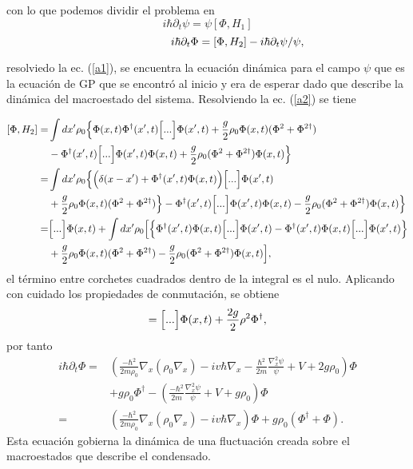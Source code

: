 con lo que podemos dividir el problema en
\begin{equation}\label{a1}
i\hbar\partial_t\psi=\psi[\Phi,H_1]
\end{equation}
\begin{equation}\label{a2}
\hspace{1.9cm} i\hbar\partial_t\Phi=[\Phi,H_2]-i\hbar\partial_t\psi/\psi,
\end{equation}

resolviedo la ec. (\ref{a1}), se encuentra la ecuaci\'{o}n din\'{a}mica para el campo $\psi$ que es la ecuaci\'{o}n de GP que se encontr\'{o} al inicio y era de esperar dado que describe la din\'{a}mica del macroestado del sistema. Resolviendo la ec. (\ref{a2}) se tiene


\begin{align}
\nonumber [\Phi,H_2]=&\int dx'\rho_0\Bigl\{\Phi(x,t)\Phi^{\dagger}(x',t)\Bigl[...\Bigr]\Phi(x',t)+\frac{g}{2}\rho_0\Phi(x,t)(\Phi^2+\Phi^{2\dagger})\\
\nonumber &-\Phi^{\dagger}(x',t)\Bigl[...\Bigr]\Phi(x',t)\Phi(x,t)+\frac{g}{2}\rho_0(\Phi^2+\Phi^{2\dagger})\Phi(x,t)\Bigr\}\\
\nonumber =&\int dx'\rho_0\Bigl\{\Bigl(\delta(x-x')+\Phi^{\dagger}(x',t)\Phi(x,t)\Bigr)\Bigl[...\Bigr]\Phi(x',t)\\
\nonumber &+\frac{g}{2}\rho_0\Phi(x,t)(\Phi^2+\Phi^{2\dagger})\Bigr\}-\Phi^{\dagger}(x',t)\Bigl[...\Bigr]\Phi(x',t)\Phi(x,t)-\frac{g}{2}\rho_0(\Phi^2+\Phi^{2\dagger})\Phi(x,t)\Bigr\}\\
\nonumber =&\Bigl[...\Bigr]\Phi(x,t)+\int dx'\rho_0\Bigl[\Bigl\{\Phi^{\dagger}(x',t)\Phi(x,t)\Bigl[...\Bigr]\Phi(x',t)-\Phi^{\dagger}(x',t)\Phi(x,t)\Bigl[...\Bigr]\Phi(x',t)\Bigr\}\\
&+\frac{g}{2}\rho_0\Phi(x,t)(\Phi^2+\Phi^{2\dagger})-\frac{g}{2}\rho_0(\Phi^2+\Phi^{2\dagger})\Phi(x,t)\Bigr],
\end{align}
el t\'{e}rmino entre corchetes cuadrados dentro de la integral es el nulo. Aplicando con cuidado los propiedades de conmutaci\'{o}n, se obtiene
\begin{align}
[\Phi,H_2]=\Bigl[...\Bigr]\Phi(x,t)+\frac{2g}{2}\rho^2\Phi^{\dagger},
\end{align}
por tanto
\begin{align}\label{ec:bogoliubov}
\nonumber i\hbar\partial_t \Phi=&\left(\frac{-\hbar^2}{2m\rho_0}\nabla_x(\rho_0\nabla_x)-iv\hbar\nabla_x-\frac{\hbar^2}{2m}\frac{\nabla_x^2 \psi}{\psi}+V+2g\rho_0\right)\Phi\\
\nonumber &+g\rho_0\Phi^{\dagger}-\left(\frac{-\hbar^2}{2m}\frac{\nabla_x^2 \psi}{\psi}+V+g\rho
_0\right)\Phi\\
=& \left(\frac{-\hbar^2}{2m\rho_0}\nabla_x(\rho_0\nabla_x)-iv\hbar\nabla_x\right)\Phi+g\rho_0(\Phi^{\dagger}+\Phi).
\end{align}
Esta ecuaci\'{o}n gobierna la din\'{a}mica de una fluctuaci\'{o}n creada sobre el macroestados que describe el condensado.
